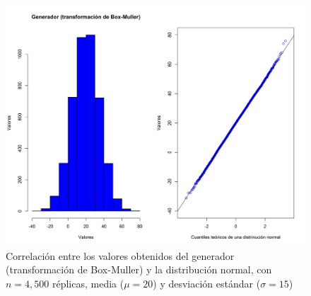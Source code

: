 \documentclass{article}
\begin{document}
\begin{figure}
\centering
\includegraphics[width=\linewidth]{Figures/uniformeNormal1.png}
\caption{Correlación entre los valores obtenidos del generador (transformación de Box-Muller) y la distribución normal, con $n= 4,500$ réplicas, media ($\mu = 20$) y desviación estándar ($\sigma = 15$)}
\label{uniformeNormal}
\end{figure}




\end{document}

